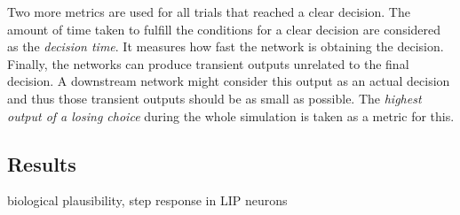 Two more metrics are used for all trials that reached a clear decision.
The amount of time taken to fulfill the conditions for a clear decision are considered as the \emph{decision time}.
It measures how fast the network is obtaining the decision.
Finally, the networks can produce transient outputs unrelated to the final decision.
A downstream network might consider this output as an actual decision and thus those transient outputs should be as small as possible.
The \emph{highest output of a losing choice} during the whole simulation is taken as a metric for this.

\subsection{Results}


biological plausibility, step response in LIP neurons
